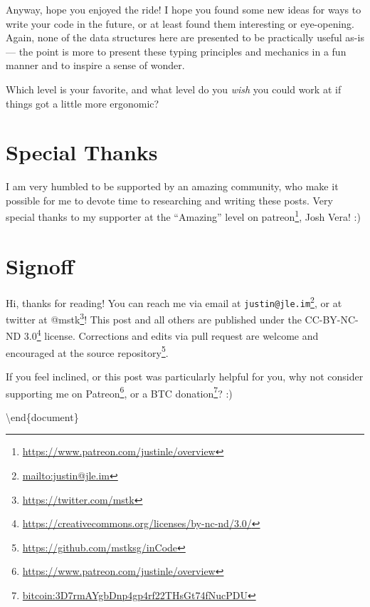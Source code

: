 \documentclass[]{article}
\renewcommand{\href}[2]{#2\footnote{\url{#1}}}
\begin{document}
Anyway, hope you enjoyed the ride! I hope you found some new ideas for ways to
write your code in the future, or at least found them interesting or
eye-opening. Again, none of the data structures here are presented to be
practically useful as-is --- the point is more to present these typing
principles and mechanics in a fun manner and to inspire a sense of wonder.

Which level is your favorite, and what level do you \emph{wish} you could work
at if things got a little more ergonomic?

\section{Special Thanks}\label{special-thanks}

I am very humbled to be supported by an amazing community, who make it possible
for me to devote time to researching and writing these posts. Very special
thanks to my supporter at the ``Amazing'' level on
\href{https://www.patreon.com/justinle/overview}{patreon}, Josh Vera! :)

\section{Signoff}\label{signoff}

Hi, thanks for reading! You can reach me via email at
\href{mailto:justin@jle.im}{\nolinkurl{justin@jle.im}}, or at twitter at
\href{https://twitter.com/mstk}{@mstk}! This post and all others are published
under the \href{https://creativecommons.org/licenses/by-nc-nd/3.0/}{CC-BY-NC-ND
3.0} license. Corrections and edits via pull request are welcome and encouraged
at \href{https://github.com/mstksg/inCode}{the source repository}.

If you feel inclined, or this post was particularly helpful for you, why not
consider \href{https://www.patreon.com/justinle/overview}{supporting me on
Patreon}, or a \href{bitcoin:3D7rmAYgbDnp4gp4rf22THsGt74fNucPDU}{BTC donation}?
:)

\textbackslash end\{document\}
\end{document}
